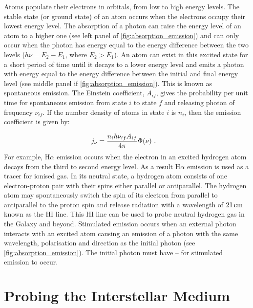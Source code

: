 Atoms populate their electrons in orbitals, from low to high energy levels. The stable state (or ground state) of an atom occurs when the electrons occupy their lowest energy level. The absorption of a photon can raise the energy level of an atom to a higher one (see left panel of \autoref{fig:absorption_emission}) and can only occur when the photon has energy equal to the energy difference between the two levels ($h\nu=E_2-E_1$, where $E_2>E_1$). An atom can exist in this excited state for a short period of time until it decays to a lower energy level and emits a photon with energy equal to the energy difference between the initial and final energy level (see middle panel if \autoref{fig:absorption_emission}). This is known as spontaneous emission. The Einstein coefficient, $A_{if}$, gives the probability per unit time for spontaneous emission from state $i$ to state $f$ and releasing photon of frequency $\nu_{if}$. If the number density of atoms in state $i$ is $n_i$, then the emission coefficient is given by:

\begin{equation}
	\begin{aligned}
		j_\nu&=\frac{n_ih\nu_{if}A_{if}}{4\pi}\Phi\qty(\nu)\text{ .}
	\end{aligned} \label{eq:interstellar_medium_emission_coefficient}
\end{equation}
\noindent For example, H$\alpha$ emission occurs when the electron in an excited hydrogen atom decays from the third to second energy level. As a result H$\alpha$ emission is used as a tracer for ionised gas. In its neutral state, a hydrogen atom consists of one electron-proton pair with their spins either parallel or antiparallel. The hydrogen atom may spontaneously switch the spin of its electron from parallel to antiparallel to the proton spin and release radiation with a wavelength of $21\,\si{\centi\meter}$ known as the HI line. This HI line can be used to probe neutral hydrogen gas in the Galaxy and beyond.
\newpar
Stimulated emission occurs when an external photon interacts with an excited atom causing an emission of a photon with the same wavelength, polarisation and direction as the initial photon (see \autoref{fig:absorption_emission}). The initial photon must have -- for stimulated emission to occur.

\section{Probing the Interstellar Medium} 

